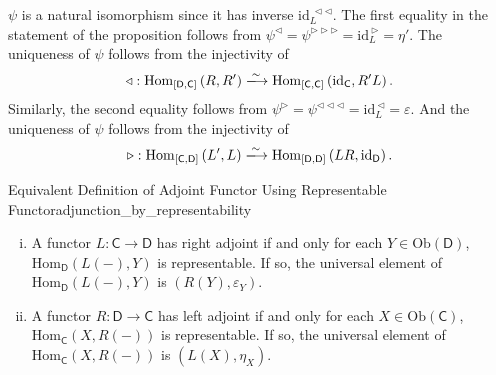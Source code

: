 \begin{prf}
\begin{center}
    \end{center}
    $\psi$ is a natural isomorphism since it has inverse $\mathrm{id}_L^{\:\triangleleft\triangleleft}$. The first equality in the statement of the proposition follows from $\psi^{\triangleleft}=\psi^{\triangleright\triangleright\triangleright}=\mathrm{id}_L^{\:\triangleright}=\eta'$. The uniqueness of $\psi$ follows from the injectivity of 
    $$
    \triangleleft:\mathrm{Hom}_{\left[\mathsf{D},\mathsf{C}\right]}\left(R,R'\right)\xlongrightarrow{\sim} \mathrm{Hom}_{\left[\mathsf{C},\mathsf{C}\right]}\left(\mathrm{id}_{\mathsf{C}},R'L\right).
    $$
    Similarly, the second equality follows from $\psi^{\triangleright}=\psi^{\triangleleft\triangleleft\triangleleft}=\mathrm{id}_L^{\:\triangleleft}=\varepsilon$. And the uniqueness of $\psi$ follows from the injectivity of
    $$
    \triangleright:\mathrm{Hom}_{\left[\mathsf{C},\mathsf{D}\right]}\left(L',L\right)\xlongrightarrow{\sim} \mathrm{Hom}_{\left[\mathsf{D},\mathsf{D}\right]}\left(LR,\mathrm{id}_{\mathsf{D}}\right).
    $$
\end{prf}



\begin{proposition}{Equivalent Definition of Adjoint Functor Using Representable Functor}{adjunction_by_representability}
    \begin{enumerate}[(i)]
        \item A functor $L:\mathsf{C}\to\mathsf{D}$ has right adjoint if and only for each $Y\in \mathrm{Ob}(\mathsf{D})$, $\mathrm{Hom}_{\mathsf{D}}\left(L(-),Y\right)$ is representable. If so, the universal element of $\mathrm{Hom}_{\mathsf{D}}\left(L(-),Y\right)$ is $\left(R(Y), \varepsilon_Y\right)$.
        \item A functor $R:\mathsf{D}\to\mathsf{C}$ has left adjoint if and only for each $X\in \mathrm{Ob}(\mathsf{C})$, $\mathrm{Hom}_{\mathsf{C}}\left(X,R(-)\right)$ is representable. If so, the universal element of $\mathrm{Hom}_{\mathsf{C}}\left(X,R(-)\right)$ is $\left(L(X), \eta_X\right)$.
    \end{enumerate}
\end{proposition}


